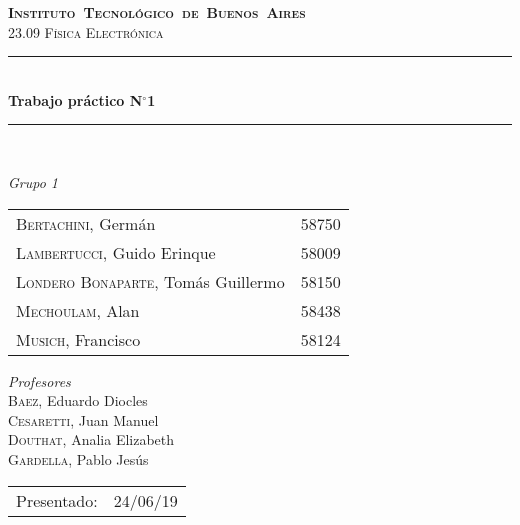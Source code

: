 \begin{titlepage}
\newcommand{\HRule}{\rule{\linewidth}{0.5mm}}
\center
\mbox{\textsc{\LARGE \bfseries {Instituto Tecnológico de Buenos Aires}}}\\[1.5cm]
\textsc{\Large 23.09 Física Electrónica}\\[0.5cm]

\HRule \\[0.6cm]
{ \Huge \bfseries Trabajo práctico N$^{\circ}$1}\\[0.4cm] 
\HRule \\[1.5cm]


{\large

\emph{Grupo 1}\\
\vspace{3px}

\begin{tabular}{lr}
\textsc{Bertachini}, Germán  & 58750 \\ 	
\textsc{Lambertucci}, Guido Erinque  & 58009 \\
\textsc{Londero Bonaparte}, Tomás Guillermo  & 58150 \\
\textsc{Mechoulam}, Alan  &  58438\\
\textsc{Musich}, Francisco  & 58124 \\

\end{tabular}

\vspace{20px}

\emph{Profesores}\\
\vspace{3px}
\textsc{Baez}, Eduardo Diocles\\ 	
\textsc{Cesaretti}, Juan Manuel\\ 
\textsc{Douthat}, Analia Elizabeth\\ 
\textsc{Gardella}, Pablo Jesús\\ 	

\vspace{100px}

\begin{tabular}{ll}

Presentado: & 24/06/19\\

\end{tabular}

}

\vfill

\end{titlepage}
